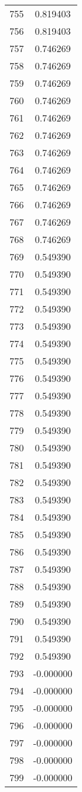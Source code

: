 \documentclass[12pt]{article}
\begin{document}
\begin{longtable}{@{}cc@{}}
755 & 0.819403 \\
756 & 0.819403 \\
757 & 0.746269 \\
758 & 0.746269 \\
759 & 0.746269 \\
760 & 0.746269 \\
761 & 0.746269 \\
762 & 0.746269 \\
763 & 0.746269 \\
764 & 0.746269 \\
765 & 0.746269 \\
766 & 0.746269 \\
767 & 0.746269 \\
768 & 0.746269 \\
769 & 0.549390 \\
770 & 0.549390 \\
771 & 0.549390 \\
772 & 0.549390 \\
773 & 0.549390 \\
774 & 0.549390 \\
775 & 0.549390 \\
776 & 0.549390 \\
777 & 0.549390 \\
778 & 0.549390 \\
779 & 0.549390 \\
780 & 0.549390 \\
781 & 0.549390 \\
782 & 0.549390 \\
783 & 0.549390 \\
784 & 0.549390 \\
785 & 0.549390 \\
786 & 0.549390 \\
787 & 0.549390 \\
788 & 0.549390 \\
789 & 0.549390 \\
790 & 0.549390 \\
791 & 0.549390 \\
792 & 0.549390 \\
793 & -0.000000 \\
794 & -0.000000 \\
795 & -0.000000 \\
796 & -0.000000 \\
797 & -0.000000 \\
798 & -0.000000 \\
799 & -0.000000 \\

\end{longtable}
\end{document}
